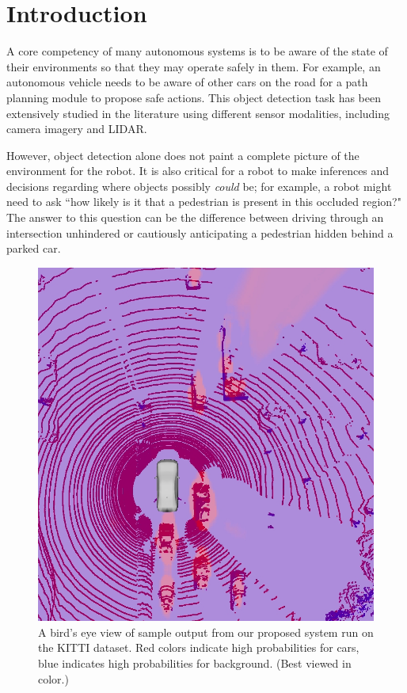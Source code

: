 \section{Introduction}\label{sec:intro}

A core competency of many autonomous systems is to be aware of the state of
their environments so that they may operate safely in them. For example, an
autonomous vehicle needs to be aware of other cars on the road for a path
planning module to propose safe actions. This object detection task has been
extensively studied in the literature using different sensor modalities,
including camera imagery and \ac{LIDAR}.

However, object detection alone does not paint a complete picture of the
environment for the robot. It is also critical for a robot to make inferences
and decisions regarding where objects possibly \emph{could} be; for example, a
robot might need to ask ``how likely is it that a pedestrian is present in this
occluded region?" The answer to this question can be the difference between
driving through an intersection unhindered or cautiously anticipating a
pedestrian hidden behind a parked car.

\begin{figure}[!t]
  \includegraphics[width=\columnwidth]{figures/badge.jpg}
  \caption{A bird's eye view of sample output from our proposed system run on
    the KITTI dataset. Red colors indicate high probabilities for cars, blue
    indicates high probabilities for background. (Best viewed in color.) }
  \vspace{-7mm}
  \label{fig:badge}
\end{figure}

